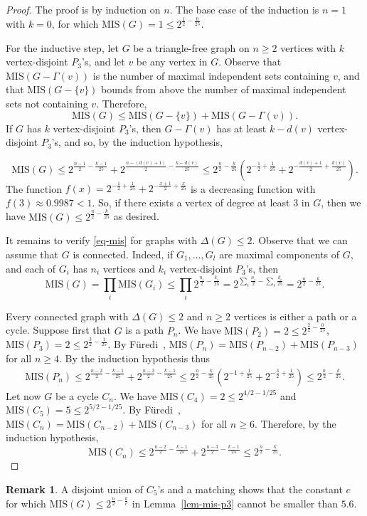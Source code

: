 \documentclass[12pt]{article}
\theoremstyle{definition}
\newtheorem{rmk}[theorem]{Remark}
\theoremstyle{definition}
\theoremstyle{definition}
\theoremstyle{definition}
\theoremstyle{definition}
\theoremstyle{definition}
\theoremstyle{definition}
\newcommand{\3}{\bf{3}}
\newcommand{\MIS}{\mathrm{MIS}}
\begin{document}
\begin{proof}
The proof is by induction on $n$. The base case of the induction is $n=1$ with $k=0$, for which $\MIS(G)=1\leq 2^{\frac{1}{2}-\frac{0}{25}}$.

For the inductive step, let $G$ be a triangle-free graph on $n\geq 2$ vertices with $k$ vertex-disjoint $P_3$'s, and let $v$ be any vertex in $G$. Observe that $\MIS(G-\Gamma(v))$ is the number of maximal independent sets containing $v$, and that $\MIS(G-\{v\})$ bounds from above the number of maximal independent sets not containing $v$. Therefore, 
$$\MIS(G)\le \MIS(G-\{v\})+\MIS(G-\Gamma(v)).$$
If $G$ has $k$ vertex-disjoint $P_3$'s, then $G-\Gamma(v)$ has at least $k-d(v)$ vertex-disjoint $P_3$'s, and so, by the induction hypothesis,

$$\MIS(G) \leq 2^{\frac{n-1}{2}-\frac{k-1}{25}}+ 2^{\frac{n-(d(v)+1)}{2}-\frac{k-d(v)}{25}}\le 2^{\frac{n}{2}-\frac{k}{25}}\left(2^{-\frac{1}{2}+\frac{1}{25}}+2^{-\frac{d(v)+1}{2}+\frac{d(v)}{25}}\right).$$
The function $f(x)=2^{-\frac{1}{2}+\frac{1}{25}}+2^{-\frac{x+1}{2}+\frac{x}{25}}$ is a decreasing function with $f(3)\approx 0.9987<1$. So, if there exists a vertex of degree at least $3$ in $G$, then we have $\MIS(G)\leq 2^{\frac{n}{2}-\frac{k}{25}}$ as desired.

It remains to verify \eqref{eq-mis} for graphs with $\Delta(G)\leq 2$. Observe that we can assume that $G$ is connected. Indeed, if  $G_1,\dots, G_l$ are maximal components of $G$, and each of $G_i$ has $n_i$ vertices and $k_i$ vertex-disjoint $P_3$'s, then $$\MIS(G)=\prod_{i} \MIS(G_i) \le \prod_i 2^{\frac{n_i}{2}-\frac{k_i}{25}}=2^{\sum_i \frac{n_i}{2}-\sum_i\frac{k_i}{25}}=2^{\frac{n}{2}-\frac{k}{25}}.$$ 

Every connected graph with $\Delta(G)\leq 2$ and $n\geq 2$ vertices is either a path or a cycle. 
 Suppose first that $G$ is a path $P_n$. We have $\MIS(P_2)=2\leq 2^{\frac{2}{2}-\frac{0}{25}}$, $\MIS(P_3)=2\leq 2^{\frac{3}{2}-\frac{1}{25}}$. By F\"uredi~\cite[Example~1.1]{Furedi}, 
 $\MIS(P_n)= \MIS(P_{n-2})+\MIS(P_{n-3})$ for all $n\geq 4$. By the induction hypothesis thus
\begin{eqnarray*}
\MIS(P_n)\leq  2^{\frac{n-2}{2}-\frac{k-1}{25}}+2^{\frac{n-3}{2}-\frac{k-1}{25}}\le 2^{\frac{n}{2}-\frac{k}{25}}\left(2^{-1+\frac{1}{25}}+2^{-\frac{3}{2}+\frac{1}{25}}\right)\leq 2^{\frac{n}{2}-\frac{k}{25}}.
\end{eqnarray*}
Let now $G$ be a cycle $C_n$. We have $\MIS(C_4)=2\leq 2^{4/2-1/25}$ and $\MIS(C_5)=5\leq 2^{5/2-1/25}$. By F\"uredi~\cite[Example~1.2]{Furedi},  $\MIS(C_n)=\MIS(C_{n-2})+\MIS(C_{n-3})$ for all $n\ge 6$. Therefore, by the induction hypothesis,
$$\MIS(C_n)\leq 2^{\frac{n-2}{2}-\frac{k-1}{25}}+2^{\frac{n-3}{2}-\frac{k-1}{25}}\le 2^{\frac{n}{2}-\frac{k}{25}}.$$
\end{proof}
\begin{rmk}
A disjoint union of $C_5$'s and a matching shows that the constant $c$ for which $\MIS(G)\le 2^{\frac{n}{2}-\frac{k}{c}}$ in Lemma~\ref{lem-mis-p3} cannot be smaller than $5.6$.
\end{rmk}
\end{document}
